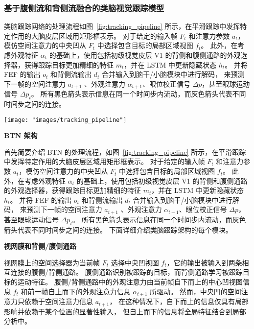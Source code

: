 \documentclass[a4paper,zihao=-4]{article}
\begin{document}
\subsubsection{基于腹侧流和背侧流融合的类脑视觉跟踪模型}

类脑跟踪网络的处理流程如图~\ref{fig:tracking_pipeline} 所示，在平滑跟踪中发挥特定作用的大脑皮层区域用矩形框表示。
对于给定的输入帧 $F_t$ 和注意力参数 $a_t$，模仿空间注意力的中央凹从 $F_t$ 中选择包含目标的局部区域视图 $f_t$。
此外，在考虑外观特征 $\alpha_t$ 的基础上，使用包括初级视觉皮层 V1 的背侧和腹侧通路的外观选择器，获得跟踪目标更加精细的特征 $m_t$，并在 LSTM 中更新隐藏状态 $h_t$。
并将 FEF 的输出 $o_t$ 和背侧流输出 $d_t$ 合并输入到脑干/小脑模块中进行解码，
来预测下一帧的空间注意力 $a_{t+1}$ 、外观注意力 $\alpha_{t +1}$、眼位校正信号 $\Delta p$，甚至眼球运动信号 $\Delta p_t$。
所有黑色箭头表示信息在同一个时间步内流动，而灰色箭头代表不同时间步之间的连接。

\begin{figure*}[htb!]
	\centering  
	{\texttt{[image: "images/tracking\_pipeline"]}
	}
	\caption{类脑视觉目标跟踪的网络架构}
	\label{fig:tracking_pipeline}
\end{figure*}

\textbf{BTN 架构}

首先简要介绍 BTN 的处理流程，如图~\ref{fig:tracking_pipeline} 所示，在平滑跟踪中发挥特定作用的大脑皮层区域用矩形框表示。
对于给定的输入帧 $F_t$ 和注意力参数 $a_t$，模仿空间注意力的中央凹从 $F_t$ 中选择包含目标的局部区域视图 $f_t$。
此外，在考虑外观特征 $\alpha_t$ 的基础上，使用包括初级视觉皮层 V1 的背侧和腹侧通路的外观选择器，获得跟踪目标更加精细的特征 $m_t$，并在 LSTM 中更新隐藏状态 $h_t$。
并将 FEF 的输出 $o_t$ 和背侧流输出 $d_t$ 合并输入到脑干/小脑模块中进行解码，
来预测下一帧的空间注意力 $a_{t+1}$ 、外观注意力 $\alpha_{t +1}$、眼位校正信号 $\Delta p$，甚至眼球运动信号 $\Delta p_t$。
所有黑色箭头表示信息在同一个时间步内流动，而灰色箭头代表不同时间步之间的连接。
下面详细介绍类脑跟踪架构的每个模块。

\textbf{视网膜和背侧/腹侧通路}

视网膜上的空间选择器为当前帧 $F_t$ 选择中央凹视图 $f_t$，它的输出被输入到两条相互连接的腹侧/背侧通路。
腹侧通路识别被跟踪的目标，而背侧通路学习被跟踪目标的运动特征。
腹侧/背侧通路中的外观注意力由当前帧自下而上的中心凹视图信息 $f_t$ 和前一帧自上而下的外观注意力信息 $\alpha_{t+1}$ 所驱动。
然而，中央凹的空间注意力只依赖于空间注意力信息 $a_{t+1}$，
在这种情况下，自下而上的信息仅具有局部影响并依赖于某个位置的显著性输入，
但自上而下的信息将全局特征结合到局部分析中。
\end{document}
